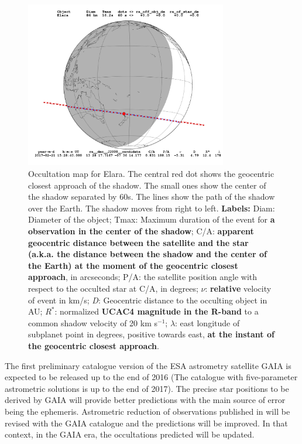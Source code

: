 \documentclass[useAMS,usenatbib]{mn2e}
\begin{document}
\begin{figure}
\begin{centering}
\includegraphics[width = 8.8cm]{figures/Elara_2017-02-21T15:28:40.png}   
\caption{Occultation map for Elara. %
The central red dot shows the geocentric closest approach of the shadow. The small ones show the center of the shadow separated by 60s. The lines show the path of the shadow over the Earth. The shadow moves from right to left.
\textbf{Labels:} Diam: Diameter of the object; Tmax: Maximum duration of the event for\textbf{ a observation in the center of the shadow}; C/A: \textbf{apparent geocentric distance between the satellite and the star (a.k.a. the distance between the shadow and the center of the Earth) at the moment of the geocentric closest approach}, in arcseconds; P/A: the satellite position angle with respect to the occulted star at C/A, in degrees; $\nu$: \textbf{relative} velocity of event in km/s; {\it D}: Geocentric distance to the occulting object in AU; $R^*$: normalized \textbf{UCAC4 magnitude in the R-band} to a common shadow velocity of 20 km s$^{-1}$; $\lambda$: east longitude of subplanet point in degrees, positive towards east, \textbf{at the instant of the geocentric closest approach}.}
\label{Fig: ocultacao}
\end{centering}
\end{figure}

The first preliminary catalogue version of the ESA astrometry satellite GAIA \citep{deBruijne2012} is expected to be released up to the end of 2016 (The catalogue with five-parameter astrometric solutions is up to the end of 2017). The precise star positions to be derived by GAIA will provide better predictions with the main source of error being the ephemeris. Astrometric reduction of observations published in  will be revised with the GAIA catalogue and the predictions will be improved. In that context, in the GAIA era, the occultations predicted will be updated.
\end{document}
